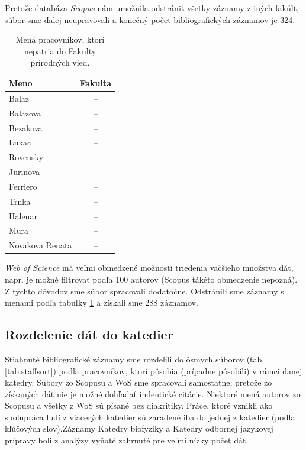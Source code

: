 Pretože databáza \emph{Scopus} nám umožnila odstrániť všetky záznamy z iných
fakúlt, súbor  sme ďalej neupravovali a
konečný počet bibliografických záznamov je 324.

\begin{table}
\centering\small
\begin{tabular}{lc}
  \hline\noalign{\vspace{.3ex}}
  Meno            & Fakulta \\[0.3ex]
  \hline\noalign{\vspace{.5ex}}
  Balaz           & -- \\
  Balazova        & -- \\
  Bezakova        & -- \\
  Lukac           & -- \\
  Rovensky        & -- \\[1ex]
  Jurinova        & -- \\
  Ferriero        & -- \\
  Trnka           & -- \\
  Halenar         & -- \\
  Mura            & -- \\[1ex]
  Novakova Renata & -- \\[0.5ex]
  \hline
\end{tabular}
\caption{Mená pracovníkov, ktorí nepatria do Fakulty prírodných vied.}
\label{tab:wos.excludedstaff}
\end{table}

\emph{Web of Science} má veľmi obmedzené možnosti triedenia väčšieho množstva
dát, napr. je možné filtrovať podľa 100 autorov (Scopus tákéto obmedzenie
nepozná). Z týchto dôvodov sme súbor  spracovali
dodatočne. Odstránili sme záznamy s menami podľa tabuľky
\ref{tab:wos.excludedstaff} a získali sme 288 záznamov.


\subsection{Rozdelenie dát do katedier}

Stiahnuté bibliografické záznamy sme rozdelili do ôsmych súborov
(tab.\,\ref{tab:staffsort}) podľa pracovníkov, ktorí pôsobia (prípadne pôsobili)
v rámci danej katedry. Súbory zo Scopusu a WoS sme spracovali samostatne,
pretože zo získaných dát nie je možné dohľadať indentické citácie. Niektoré mená
autorov zo Scopusu a všetky z WoS sú písané bez diakritiky. Práce, ktoré vznikli
ako spolupráca ľudí z viacerých katedier sú zaradené iba do jednej z katedier
(podľa kľúčových slov).Záznamy Katedry biofyziky a Katedry odbornej jazykovej
prípravy boli z analýzy vyňaté zahrnuté pre veľmi nízky počet dát.

